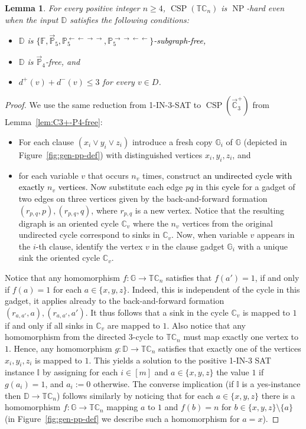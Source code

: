 \documentclass{article}
\newtheorem{lemma}[theorem]{Lemma}
\theoremstyle{definition}
\theoremstyle{remark}
\newcommand{\blue}[1]{\textcolor{black}{#1}}
\DeclareMathOperator{\NP}{NP}
\DeclareMathOperator{\CSP}{CSP}
\newcommand{\bC}{{\mathbb C}}
\newcommand{\bD}{{\mathbb D}}
\newcommand{\bF}{{\mathbb F}}
\newcommand{\bG}{{\mathbb G}}
\newcommand{\bI}{{\mathbb I}}
\newcommand{\bP}{{\mathbb P}}
\newcommand{\bT}{{\mathbb T}}
\begin{document}
\begin{lemma}\label{lem:TCkxTTk}
    For every positive integer $n\ge 4$, $\CSP(\bT\bC_n)$ is $\NP$-hard even when the input
    $\bD$ satisfies the following conditions:
    \begin{itemize}
        \item $\bD$ is \blue{$\{\bF,\vec{\bP}_5,\bP_5^{\leftarrow\leftarrow\to\to},\bP_5^{\to\to\leftarrow\leftarrow}\}$-subgraph-free,} 
        \item $\bD$ is $\vec{\bP}_4$-free, and
        \item $d^+(v) + d^-(v) \le 3$ for every $v\in D$.
    \end{itemize}
\end{lemma}
\begin{proof}
    We use the same reduction from 1-IN-3-SAT to $\CSP(\vec{\bC}_3^+)$ from Lemma~\ref{lem:C3+-P4-free}:
    \begin{itemize}
       \item For each clause $(x_i\lor y_i \lor z_i)$ introduce  a fresh copy $\bG_i$ of $\bG$
       (depicted in Figure~\ref{fig:gen-pp-def}) with distinguished vertices $x_i,y_i,z_i$, and
       \item for each variable $v$ that occurs $n_v$ times, construct \blue{an undirected cycle with exactly}
       $n_v$ \blue{vertices}. Now substitute each edge $pq$ in this \blue{cycle} for a gadget of two edges on
       three vertices given by the back-and-forward formation $(r_{p,q},p),(r_{p,q},q)$, where $r_{p,q}$ is a new vertex. 
       Notice that the resulting digraph is an oriented cycle $\bC_v$ where the $n_v$ vertices from the original
       undirected cycle correspond to sinks in $\bC_v$. Now, when variable $v$ appears in the $i$-th clause, identify
       the vertex $v$ in the clause gadget $\bG_i$ with a unique sink the oriented cycle $\bC_v$.
   \end{itemize}
    Notice that any homomorphism $f\colon \bG\to \bT\bC_n$ satisfies that $f(a') = 1$, 
   if and only if $f(a) = 1$ for each $a\in\{x,y,z\}$. Indeed, this is independent of the cycle in this gadget,
   it applies already to the back-and-forward formation $(r_{a,a'},a),(r_{a,a'},a')$. It thus follows that
    a sink in the cycle $\bC_v$ is mapped to $1$ if and only if all sinks in $\bC_v$ are mapped to $1$.
    Also notice that any homomorphism from the directed $3$-cycle to $\bT\bC_n$ must map exactly one vertex to $1$. 
   Hence, any homomorphism $g\colon\bD\to \bT\bC_n$ satisfies that exactly one of
   the vertices $x_i,y_i,z_i$ is mapped to $1$. This yields a solution to the positive
   1-IN-3 SAT instance $\bI$ by assigning for each $i\in[m]$ and $a\in\{x,y,z\}$
   the value $1$ if $g(a_i) = 1$, and $a_i := 0$ otherwise. The converse implication
   (if $\bI$ is a yes-instance then $\bD\to \bT\bC_n$) follows similarly by noticing
   that for each $a\in \{x,y,z\}$ there is a homomorphism $f\colon \bG\to \bT\bC_n$
   mapping $a$ to $1$ and $f(b) = n$ for $b\in\{x,y,z\}\setminus\{a\}$ (in Figure~\ref{fig:gen-pp-def}
   we describe such a homomorphism for $a = x$). 


\end{proof}
\end{document}
